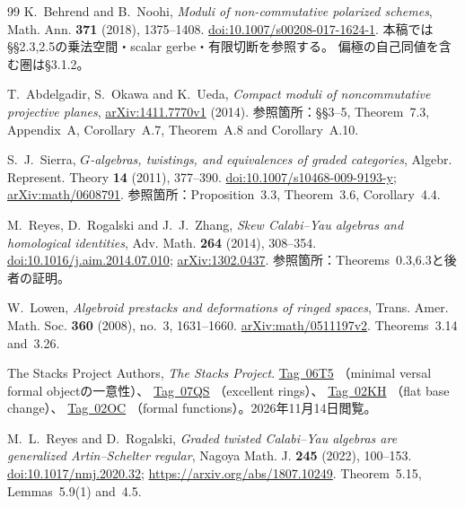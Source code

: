 \documentclass[11pt,a4paper]{ltjsarticle}
\numberwithin{equation}{section}
\begin{document}
\begin{thebibliography}{99}
K.~Behrend and B.~Noohi,
\emph{Moduli of non-commutative polarized schemes},
Math. Ann. \textbf{371} (2018), 1375--1408.
\href{https://doi.org/10.1007/s00208-017-1624-1}{doi:10.1007/s00208-017-1624-1}.
本稿では\S\S2.3,2.5の乗法空間・scalar gerbe・有限切断を参照する。
偏極の自己同値を含む圏は\S3.1.2。

T.~Abdelgadir, S.~Okawa and K.~Ueda,
\emph{Compact moduli of noncommutative projective planes},
\href{https://arxiv.org/abs/1411.7770v1}{arXiv:1411.7770v1} (2014).
参照箇所：\S\S3--5, Theorem~7.3, Appendix~A, Corollary~A.7, Theorem~A.8 and Corollary~A.10.

S.~J.~Sierra,
\emph{$G$-algebras, twistings, and equivalences of graded categories},
Algebr. Represent. Theory \textbf{14} (2011), 377--390.
\href{https://doi.org/10.1007/s10468-009-9193-y}{doi:10.1007/s10468-009-9193-y};
\href{https://arxiv.org/abs/math/0608791}{arXiv:math/0608791}.
参照箇所：Proposition~3.3, Theorem~3.6, Corollary~4.4.

M.~Reyes, D.~Rogalski and J.~J.~Zhang,
\emph{Skew Calabi--Yau algebras and homological identities},
Adv. Math. \textbf{264} (2014), 308--354.
\href{https://doi.org/10.1016/j.aim.2014.07.010}{doi:10.1016/j.aim.2014.07.010};
\href{https://arxiv.org/abs/1302.0437}{arXiv:1302.0437}.
参照箇所：Theorems~0.3,6.3と後者の証明。

W.~Lowen,
\emph{Algebroid prestacks and deformations of ringed spaces},
Trans. Amer. Math. Soc. \textbf{360} (2008), no.~3, 1631--1660.
\href{https://arxiv.org/abs/math/0511197}{arXiv:math/0511197v2}.
Theorems~3.14 and~3.26.

The Stacks Project Authors,
\emph{The Stacks Project}.
\href{https://stacks.math.columbia.edu/tag/06T5}{Tag~06T5}
（minimal versal formal objectの一意性）、
\href{https://stacks.math.columbia.edu/tag/07QS}{Tag~07QS}
（excellent rings）、
\href{https://stacks.math.columbia.edu/tag/02KH}{Tag~02KH}
（flat base change）、
\href{https://stacks.math.columbia.edu/tag/02OC}{Tag~02OC}
（formal functions）。2026年11月14日閲覧。

M.~L.~Reyes and D.~Rogalski,
\emph{Graded twisted Calabi--Yau algebras are generalized Artin--Schelter regular},
Nagoya Math. J. \textbf{245} (2022), 100--153.
\href{https://doi.org/10.1017/nmj.2020.32}{doi:10.1017/nmj.2020.32};
\url{https://arxiv.org/abs/1807.10249}.
Theorem~5.15, Lemmas~5.9(1) and~4.5.


\end{thebibliography}
\end{document}
